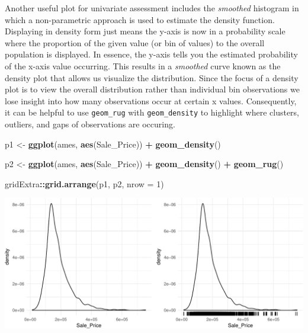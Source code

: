 \documentclass[]{article}
\newenvironment{Shaded}{\begin{snugshade}}{\end{snugshade}}
\newcommand{\KeywordTok}[1]{\textcolor[rgb]{0.13,0.29,0.53}{\textbf{#1}}}
\newcommand{\DataTypeTok}[1]{\textcolor[rgb]{0.13,0.29,0.53}{#1}}
\newcommand{\DecValTok}[1]{\textcolor[rgb]{0.00,0.00,0.81}{#1}}
\newcommand{\StringTok}[1]{\textcolor[rgb]{0.31,0.60,0.02}{#1}}
\newcommand{\OperatorTok}[1]{\textcolor[rgb]{0.81,0.36,0.00}{\textbf{#1}}}
\newcommand{\NormalTok}[1]{#1}
\begin{document}
Another useful plot for univariate assessment includes the
\emph{smoothed} histogram in which a non-parametric approach is used to
estimate the density function. Displaying in density form just means the
y-axis is now in a probability scale where the proportion of the given
value (or bin of values) to the overall population is displayed. In
essence, the y-axis tells you the estimated probability of the x-axis
value occurring. This results in a \emph{smoothed} curve known as the
density plot that allows us visualize the distribution. Since the focus
of a density plot is to view the overall distribution rather than
individual bin observations we lose insight into how many observations
occur at certain x values. Consequently, it can be helpful to use
\texttt{geom\_rug} with \texttt{geom\_density} to highlight where
clusters, outliers, and gaps of observations are occuring.

\begin{Shaded}
\begin{Highlighting}[]
\NormalTok{p1 <-}\StringTok{ }\KeywordTok{ggplot}\NormalTok{(ames, }\KeywordTok{aes}\NormalTok{(Sale_Price)) }\OperatorTok{+}
\StringTok{  }\KeywordTok{geom_density}\NormalTok{()}

\NormalTok{p2 <-}\StringTok{ }\KeywordTok{ggplot}\NormalTok{(ames, }\KeywordTok{aes}\NormalTok{(Sale_Price)) }\OperatorTok{+}
\StringTok{  }\KeywordTok{geom_density}\NormalTok{() }\OperatorTok{+}
\StringTok{  }\KeywordTok{geom_rug}\NormalTok{()}

\NormalTok{gridExtra}\OperatorTok{::}\KeywordTok{grid.arrange}\NormalTok{(p1, p2, }\DataTypeTok{nrow =} \DecValTok{1}\NormalTok{)}
\end{Highlighting}
\end{Shaded}

\begin{center}\includegraphics{Chapter_3_-_Visualization_files/figure-latex/density-1} \end{center}
\end{document}
